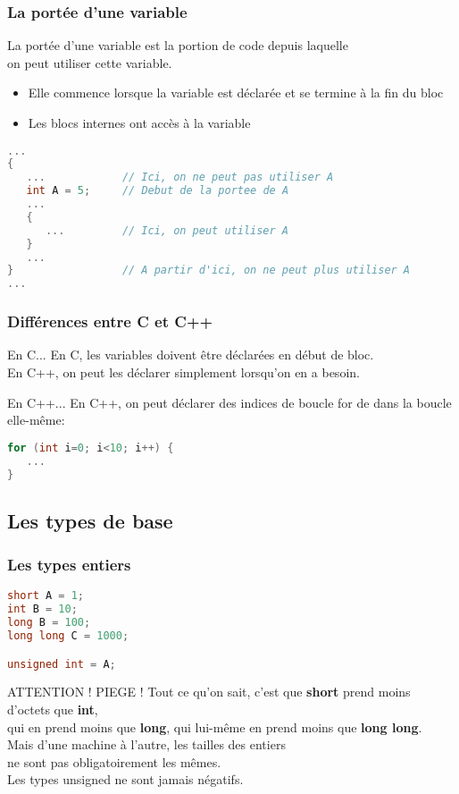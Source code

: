 \documentclass{beamer}
\begin{document}
\begin{frame}[fragile=singleslide,shrink=20]
\frametitle {La portée d'une variable}
La portée d'une variable est la portion de code depuis laquelle \\
on peut utiliser cette variable. \\
\begin{itemize}
\item{Elle commence lorsque la variable est déclarée et se termine à la fin du bloc}
\item{Les blocs internes ont accès à la variable}
\end{itemize}

\begin{lstlisting}[language=c++]
...
{
   ...            // Ici, on ne peut pas utiliser A
   int A = 5;     // Debut de la portee de A
   ...
   {
      ...         // Ici, on peut utiliser A
   }
   ...
}                 // A partir d'ici, on ne peut plus utiliser A 
...
\end{lstlisting}
\end{frame}

\begin{frame}[fragile=singleslide,shrink=20]
\frametitle {Différences entre C et C++}

\begin{block}{En C...}
En C, les variables doivent être déclarées en début de bloc. \\
En C++, on peut les déclarer simplement lorsqu'on en a besoin.
\end{block}
\begin{block}{En C++...}
En C++, on peut déclarer des indices de boucle for de dans la boucle elle-même:
\begin{lstlisting}[language=c++]
for (int i=0; i<10; i++) {
   ...
}
\end{lstlisting}
\end{block}
\end{frame}

\subsection{Les types de base}

\begin{frame}[fragile=singleslide,shrink=20]
\frametitle {Les types entiers}
\begin{lstlisting}[language=c++]
short A = 1;
int B = 10;
long B = 100;
long long C = 1000;

unsigned int = A;

\end{lstlisting}
\begin{block}{ATTENTION ! PIEGE !}
Tout ce qu'on sait, c'est que \textbf{short} prend moins d'octets que \textbf{int}, \\
qui en prend moins que \textbf{long}, qui lui-même en prend moins que \textbf{long long}. \\
Mais d'une machine à l'autre, les tailles des entiers \\ 
ne sont pas obligatoirement les mêmes. \\
Les types unsigned ne sont jamais négatifs.
\end{block}
\end{frame}
\end{document}
